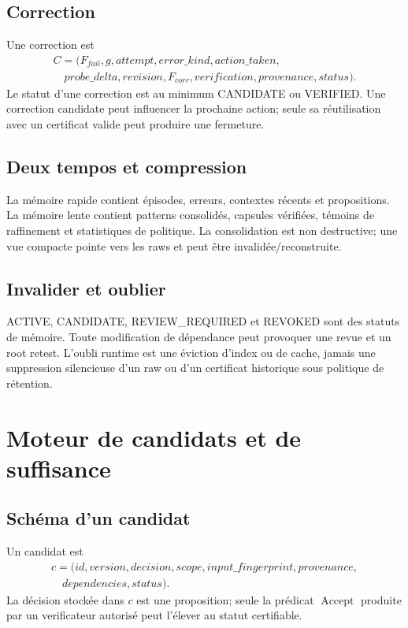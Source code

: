 \documentclass[11pt,a4paper]{report}
\begin{document}
\section{Correction}
Une correction est
\[
\begin{aligned}
C=(F_{fail},g,attempt,error\_kind,action\_taken,\\
\quad probe\_delta,revision,F_{corr},verification,provenance,status).
\end{aligned}
\]
Le statut d'une correction est au minimum CANDIDATE ou VERIFIED. Une correction candidate peut influencer la prochaine action; seule sa réutilisation avec un certificat valide peut produire une fermeture.

\section{Deux tempos et compression}
La mémoire rapide contient épisodes, erreurs, contextes récents et propositions. La mémoire lente contient patterns consolidés, capsules vérifiées, témoins de raffinement et statistiques de politique. La consolidation est non destructive; une vue compacte pointe vers les raws et peut être invalidée/reconstruite.

\section{Invalider et oublier}
ACTIVE, CANDIDATE, REVIEW\_REQUIRED et REVOKED sont des statuts de mémoire. Toute modification de dépendance peut provoquer une revue et un root retest. L'oubli runtime est une éviction d'index ou de cache, jamais une suppression silencieuse d'un raw ou d'un certificat historique sous politique de rétention.

\chapter{Moteur de candidats et de suffisance}
\section{Schéma d'un candidat}
Un candidat est
\[
\begin{aligned}
c=(id,version,decision,scope,input\_fingerprint,provenance,\\
\quad dependencies,status).
\end{aligned}
\]
La décision stockée dans $c$ est une proposition; seule la prédicat $\operatorname{Accept}$ produite par un verificateur autorisé peut l'élever au statut certifiable.
\end{document}
